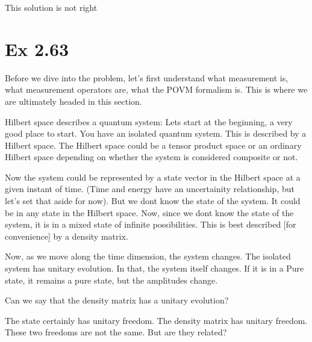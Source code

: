 \documentclass{article}
\newcommand{\0}{{$|0\rangle$}}
\newcommand{\1}{{$|1\rangle$}}
\newcommand{\2}{\frac{1}{\sqrt{2}}}
\begin{document}
This solution is not right
\newpage
\section*{Ex 2.63}
Before we dive into the problem, let's first understand what measurement is, what measurement operators are, what the POVM formalism is. This is where we are ultimately headed in this section. 

Hilbert space describes a quantum system: Lets start at the beginning, a very good place to start. You have an isolated quantum system. This is described by a Hilbert space. The Hilbert space could be a tensor product space or an ordinary Hilbert space depending on whether the system is considered composite or not. 

Now the system could be represented by a state vector in the Hilbert space at a given instant of time. (Time and energy have an uncertainity relationship, but let's set that aside for now).  But we dont know the state of the system. It could be in any state in the Hilbert space. Now, since we dont know the state of the system, it is in a mixed state of infinite possibilities. This is best described [for convenience] by a density matrix. 

Now, as we move along the time dimension, the system changes. The isolated system has unitary evolution. In that, the system itself changes. If it is in a Pure state, it remains a pure state, but the amplitudes change. 

Can we say that the density matrix has a unitary evolution? 

The state certainly has unitary freedom. The density matrix has unitary freedom. These two freedoms are not the same. But are they related? 
\end{document}
